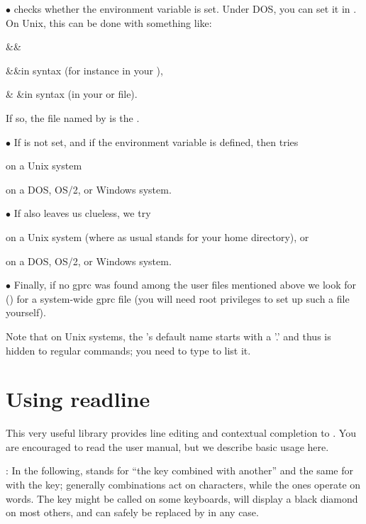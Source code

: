 \noindent$\bullet$  checks whether the environment variable
 is set. Under DOS, you can set it in . On Unix,
this can be done with something like: \smallskip

\settabs\+\indent&\quad&\cr

\+&\quad&in  syntax
(for instance in your ),\cr

\+& &in  syntax
(in your  or  file).\cr

\noindent If so, the file named by  is the .

\noindent$\bullet$ If  is not set, and if the environment variable
 is defined,  then tries

 on a Unix system

 on a DOS, OS/2, or Windows system.

\noindent$\bullet$ If  also leaves us clueless, we try

\strut{} on a Unix system (where as usual \kbd{\til} stands for
your home directory), or

 on a DOS, OS/2, or Windows system.

\noindent$\bullet$ Finally, if no gprc was found among the user files
mentioned above we look for  ()
for a system-wide gprc file (you will need root privileges to set up such a
file yourself).

Note that on Unix systems, the 's default name starts with a '.' and
thus is hidden to regular  commands; you need to type  to
list it.


\section{Using readline} 

This very useful library provides line editing and contextual completion
to . You are encouraged to read the  user manual,
but we describe basic usage here.

: \label{se:readline}
In the following,  stands for ``the  key combined with
another'' and the same for  with the  key; generally
 combinations act on characters, while the  ones operate on
words. The  key might be called  on some keyboards, will
display a black diamond on most others, and can safely be replaced by
 in any case.

